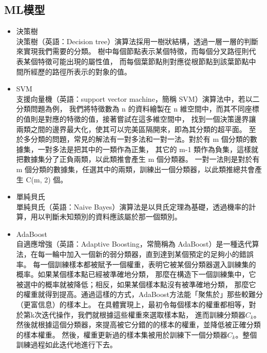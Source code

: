 	\subsection{ML模型}
	\begin{itemize}
		\item 決策樹\\
			決策樹（英語：Decision tree）演算法採用一樹狀結構，透過一層一層的判斷來實現我們需要的分類。
			樹中每個節點表示某個特徵，而每個分叉路徑則代表某個特徵可能出現的屬性值，
			而每個葉節點則對應從根節點到該葉節點中間所經歷的路徑所表示的對象的值。
		\item SVM\\
			支援向量機（英語：support vector machine，簡稱 SVM）演算法中，若以二分類問題為例，
			我們將特徵數為 n 的資料繪製在 n 維空間中，而其不同座標的值則是對應的特徵的值，接著嘗試在這多維空間中，
			找到一個決策邊界讓兩類之間的邊界最大化，使其可以完美區隔開來，即為其分類的超平面。
			至於多分類的問題，常見的解法有一對多法和一對一法。對於有 m 個分類的數據集，一對多法是把其中的一類作為正集，
			其它的 m-1 類作為負集，這樣就把數據集分了正負兩類，以此類推會產生 m 個分類器。
			一對一法則是對於有 m 個分類的數據集，任選其中的兩類，訓練出一個分類器，以此類推總共會產生 C(m, 2) 個。
		\item 單純貝氏\\
			單純貝氏（英語：Naive Bayes）演算法是以貝氏定理為基礎，透過機率的計算，用以判斷未知類別的資料應該屬於那一個類別。
		\item AdaBoost\\
			自適應增強（英語：Adaptive Boosting，常簡稱為 AdaBoost）是一種迭代算法，在每一輪中加入一個新的弱分類器，直到達到某個預定的足夠小的錯誤率。
			每一個訓練樣本都被賦予一個權重，表明它被某個分類器選入訓練集的概率。如果某個樣本點已經被準確地分類，
			那麼在構造下一個訓練集中，它被選中的概率就被降低；相反，如果某個樣本點沒有被準確地分類，
			那麼它的權重就得到提高。通過這樣的方式，AdaBoost方法能「聚焦於」那些較難分（更富信息）的樣本上。
			在具體實現上，最初令每個樣本的權重都相等，對於第k次迭代操作，我們就根據這些權重來選取樣本點，
			進而訓練分類器$C_k$。然後就根據這個分類器，來提高被它分錯的的樣本的權重，並降低被正確分類的樣本權重。
			然後，權重更新過的樣本集被用於訓練下一個分類器$C_k$。整個訓練過程如此迭代地進行下去。
	\end{itemize}